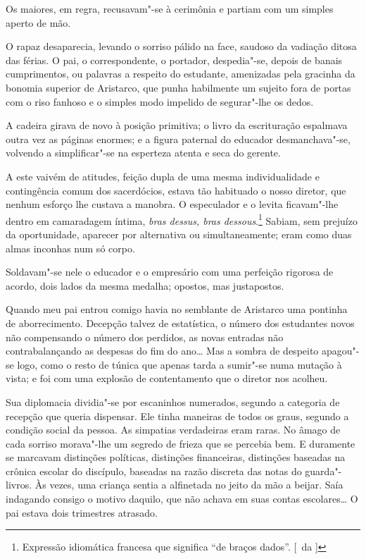 Os maiores, em regra, recusavam"-se à cerimônia e partiam com
um simples aperto de mão. 

O rapaz desaparecia, levando o sorriso pálido
na face, saudoso da vadiação ditosa das férias. O pai, o
correspondente, o portador, despedia"-se, depois de banais
cumprimentos, ou palavras a respeito do estudante, amenizadas pela
gracinha da bonomia superior de Aristarco, que punha habilmente um
sujeito fora de portas com o riso fanhoso e o simples modo impelido de
segurar"-lhe os dedos. 


A cadeira girava de novo à posição primitiva; o
livro da escrituração espalmava outra vez as páginas enormes; e a
figura paternal do educador desmanchava"-se, volvendo a
simplificar"-se na esperteza atenta e seca do gerente. 

A este vaivém de atitudes, feição dupla de uma mesma individualidade e contingência
comum dos sacerdócios, estava tão habituado o nosso diretor, que nenhum
esforço lhe custava a manobra. O especulador e o levita ficavam"-lhe
dentro em camaradagem íntima, \textit{bras dessus, bras dessous}.\footnote{ Expressão idiomática 
francesa que significa ``de braços dados''. [~da ]}
Sabiam, sem prejuízo da oportunidade, aparecer por alternativa ou simultaneamente;
eram como duas almas inconhas num só corpo. 

Soldavam"-se nele o educador e o empresário com uma perfeição rigorosa de acordo, 
dois lados da mesma medalha; opostos, mas justapostos. 

Quando meu pai entrou
comigo havia no semblante de Aristarco uma pontinha de aborrecimento.
Decepção talvez de estatística, o número dos estudantes novos não
compensando o número dos perdidos, as novas entradas não
contrabalançando as despesas do fim do ano\ldots{} Mas a sombra de despeito
apagou"-se logo, como o resto de túnica que apenas tarda a sumir"-se
numa mutação à vista; e foi com uma explosão de contentamento que o
diretor nos acolheu. 

Sua diplomacia dividia"-se por escaninhos
numerados, segundo a categoria de recepção que queria dispensar. Ele
tinha maneiras de todos os graus, segundo a condição social da pessoa.
As simpatias verdadeiras eram raras. No âmago de cada sorriso
morava"-lhe um segredo de frieza que se percebia bem. E duramente se
marcavam distinções políticas, distinções financeiras, distinções
baseadas na crônica escolar do discípulo, baseadas na razão discreta
das notas do guarda"-livros. Às vezes, uma criança sentia a alfinetada
no jeito da mão a beijar. Saía indagando consigo o motivo daquilo, que
não achava em suas contas escolares\ldots{} O pai estava dois trimestres
atrasado. 

